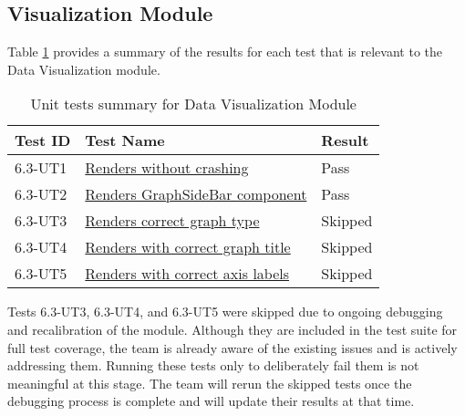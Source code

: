 \documentclass[12pt, titlepage]{article}
\begin{document}
\subsection{Visualization Module}
Table \ref{UT:VM} provides a summary of the results for each test that is
relevant to the Data Visualization module.

\begin{table}[H]
  \centering
  \begin{tabular}{|l|l|l|}
    \hline
    \textbf{Test ID} & \textbf{Test Name} & \textbf{Result}\\
    \hline
    6.3-UT1 & \href{https://github.com/SumanyaG/Alkalytics/blob/main/src/frontend/test/visualize/visualize.test.tsx}{Renders without crashing} & Pass \\
    \hline
    6.3-UT2 & \href{https://github.com/SumanyaG/Alkalytics/blob/main/src/frontend/test/visualize/visualize.test.tsx}{Renders GraphSideBar component} & Pass \\
    \hline
    6.3-UT3 & \href{https://github.com/SumanyaG/Alkalytics/blob/main/src/frontend/test/visualize/visualize.test.tsx}{Renders correct graph type} & Skipped \\
    \hline
    6.3-UT4 & \href{https://github.com/SumanyaG/Alkalytics/blob/main/src/frontend/test/visualize/visualize.test.tsx}{Renders with correct graph title} & Skipped \\
    \hline
    6.3-UT5 & \href{https://github.com/SumanyaG/Alkalytics/blob/main/src/frontend/test/visualize/visualize.test.tsx}{Renders with correct axis labels} & Skipped \\
    \hline
  \end{tabular}
  \caption{Unit tests summary for Data Visualization Module}
  \label{UT:VM}
\end{table}

Tests 6.3-UT3, 6.3-UT4, and 6.3-UT5 were skipped due to ongoing debugging and recalibration of the module. Although they are included in the test suite for full test 
coverage, the team is already aware of the existing issues and is actively addressing them. Running these tests only to deliberately fail them is not meaningful at 
this stage. The team will rerun the skipped tests once the debugging process is complete and will update their results at that time.
\end{document}
